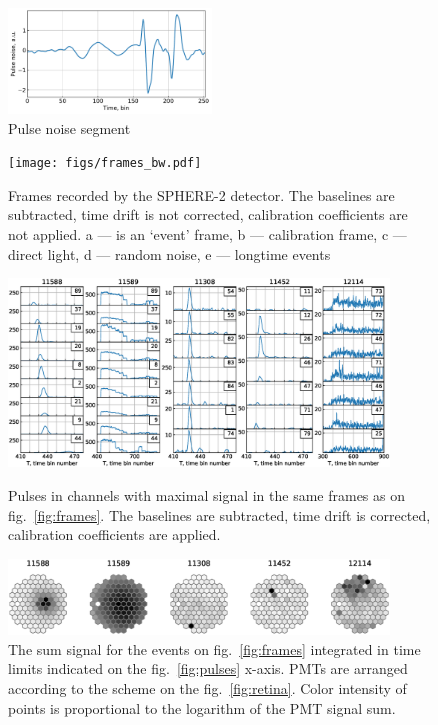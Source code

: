\documentclass[final,5p,times,twocolumn]{elsarticle}
\begin{document}
\begin{figure}[tb]
\includegraphics[width=0.48\textwidth]{figs/pulse_noise_segment.pdf}
\caption{Pulse noise segment}
\label{fig:pulse_noise_segment}
\end{figure}




\begin{figure}[btp]
    \centering
    \texttt{[image: figs/frames\_bw.pdf]}
    \caption{Frames recorded by the SPHERE-2 detector. The baselines are subtracted, time drift is not corrected, calibration coefficients are not applied. a --- is an `event' frame, b --- calibration frame, c --- direct light, d --- random noise, e --- longtime events}
    \label{fig:frames}

\includegraphics[width=0.9\textwidth]{figs/pulses.eps}%
\caption{Pulses in channels with maximal signal in the same frames as on fig.~\ref{fig:frames}. The baselines are subtracted, time drift is corrected, calibration coefficients are applied.}
\label{fig:pulses}
\vspace{1.2pc}
\includegraphics[width=0.9\textwidth]{figs/mosaic_sums_lin.eps}%
\vspace{-1.0pc}
\caption{The sum signal for the events on fig.~\ref{fig:frames} integrated in time limits indicated on the fig.~\ref{fig:pulses} x-axis. PMTs are arranged according to the scheme on the fig.~\ref{fig:retina}. Color intensity of points is proportional to the logarithm of the PMT signal sum.}
\label{fig:mosaic_sum}
\end{figure}
\end{document}
